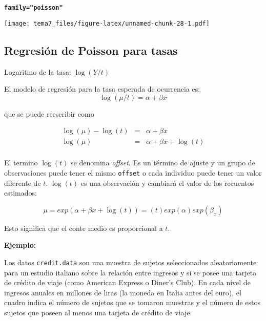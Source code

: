 \documentclass[]{article}
\newenvironment{Shaded}{\begin{snugshade}}{\end{snugshade}}
\newcommand{\KeywordTok}[1]{\textcolor[rgb]{0.13,0.29,0.53}{\textbf{{#1}}}}
\newcommand{\DataTypeTok}[1]{\textcolor[rgb]{0.13,0.29,0.53}{{#1}}}
\newcommand{\DecValTok}[1]{\textcolor[rgb]{0.00,0.00,0.81}{{#1}}}
\newcommand{\StringTok}[1]{\textcolor[rgb]{0.31,0.60,0.02}{{#1}}}
\newcommand{\NormalTok}[1]{{#1}}
\numberwithin{equation}{section}
\begin{document}
\textbf{\texttt{family="poisson"}}

\begin{Shaded}
\end{Shaded}

\texttt{[image: tema7\_files/figure-latex/unnamed-chunk-28-1.pdf]}

\subsection{Regresión de Poisson para
tasas}\label{regresion-de-poisson-para-tasas}

Logaritmo de la tasa: \(\log(Y/t)\)

El modelo de regresión para la tasa esperada de ocurrencia es: \[
\log(\mu/t)= \alpha + \beta x
\]

que se puede reescribir como

\begin{eqnarray*}
\log(\mu)-\log(t) &= & \alpha +  \beta x \\
\log(\mu) & =& \alpha + \beta x + \log(t) \\
\end{eqnarray*}

El termino \(\log(t)\) se denomina \emph{offset}. Es un término de
ajuste y un grupo de observaciones puede tener el mismo \texttt{offset}
o cada individuo puede tener un valor diferente de \(t\). \(\log(t)\) es
una observación y cambiará el valor de los recuentos estimados:

\[
\mu =exp(\alpha+\beta x+\log(t))=(t)exp(\alpha)exp(\beta_x)
\]

Esto significa que el conte medio es proporcional a \(t\).

\textbf{Ejemplo:}

Los datos \texttt{credit.data} son una muestra de sujetos seleccionados
aleatoriamente para un estudio italiano sobre la relación entre ingresos
y si se posee una tarjeta de crédito de viaje (como American Express o
Diner's Club). En cada nivel de ingresos anuales en millones de liras
(la moneda en Italia antes del euro), el cuadro indica el número de
sujetos que se tomaron muestras y el número de estos sujetos que poseen
al menos una tarjeta de crédito de viaje.
\end{document}
